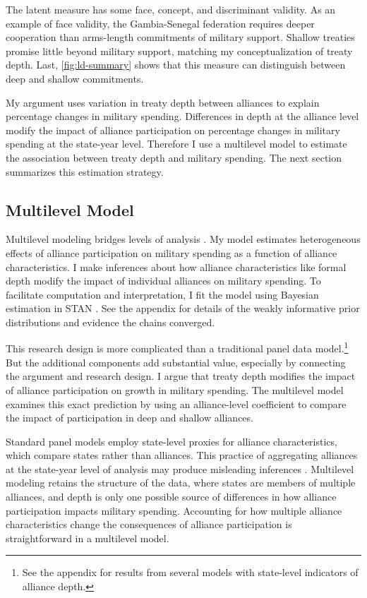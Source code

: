 \documentclass[12pt]{article}
\begin{document}
The latent measure has some face, concept, and discriminant validity. 
As an example of face validity, the Gambia-Senegal federation requires deeper cooperation than arms-length commitments of military support. 
Shallow treaties promise little beyond military support, matching my conceptualization of treaty depth. 
Last, \autoref{fig:ld-summary} shows that this measure can distinguish between deep and shallow commitments. 


My argument uses variation in treaty depth between alliances to explain percentage changes in military spending.
Differences in depth at the alliance level modify the impact of alliance participation on percentage changes in military spending at the state-year level. 
Therefore I use a multilevel model to estimate the association between treaty depth and military spending.  
The next section summarizes this estimation strategy. 


\subsection*{Multilevel Model} 


Multilevel modeling bridges levels of analysis \citep{SteenbergenJones2002, GelmanHill2007}. 
My model estimates heterogeneous effects of alliance participation on military spending as a function of alliance characteristics. 
I make inferences about how alliance characteristics like formal depth modify the impact of individual alliances on military spending. 
To facilitate computation and interpretation, I fit the model using Bayesian estimation in STAN \citep{Carpenteretal2016}. 
See the appendix for details of the weakly informative prior distributions and evidence the chains converged.


This research design is more complicated than a traditional panel data model.\footnote{See the appendix for results from several models with state-level indicators of alliance depth.}
But the additional components add substantial value, especially by connecting the argument and research design.
I argue that treaty depth modifies the impact of alliance participation on growth in military spending. 
The multilevel model examines this exact prediction by using an alliance-level coefficient to compare the impact of participation in deep and shallow alliances. 


Standard panel models employ state-level proxies for alliance characteristics, which compare states rather than alliances.
This practice of aggregating alliances at the state-year level of analysis may produce misleading inferences \citep[pg. 356]{McElreath2016}.
Multilevel modeling retains the structure of the data, where states are members of multiple alliances, and depth is only one possible source of differences in how alliance participation impacts military spending. 
Accounting for how multiple alliance characteristics change the consequences of alliance participation is straightforward in a multilevel model. 
\end{document}
